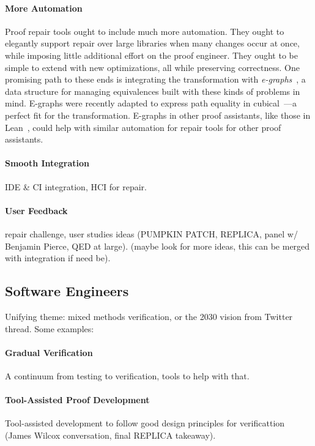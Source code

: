 \paragraph{More Automation}
Proof repair tools ought to include much more automation.
They ought to elegantly support repair over large libraries when many changes occur at once,
while imposing little additional effort on the proof engineer.
They ought to be simple to extend with new optimizations, all while preserving correctness.
One promising path to these ends is integrating the \toolnamec transformation with \textit{e-graphs}~\cite{egraph1},
a data structure %
for managing equivalences
built with these kinds of problems in mind.
E-graphs were recently adapted to express path equality in cubical~\cite{egraph6}---a perfect fit for the \toolnamec transformation.
E-graphs in other proof assistants, like those in Lean~\cite{selsam:lean}, could help with similar automation for repair tools for other proof assistants.

\paragraph{Smooth Integration} IDE \& CI integration, HCI for repair.

\paragraph{User Feedback} repair challenge, user studies ideas (PUMPKIN PATCH, REPLICA, panel w/ Benjamin Pierce, QED at large). (maybe look for more ideas, this can be merged with integration if need be).

\subsection*{Software Engineers}

Unifying theme: mixed methods verification, or the 2030 vision from Twitter thread. Some examples:

\paragraph{Gradual Verification} A continuum from testing to verification, tools to help with that.

\paragraph{Tool-Assisted Proof Development} Tool-assisted development to follow good design principles for verificattion (James Wilcox conversation, final REPLICA takeaway).

